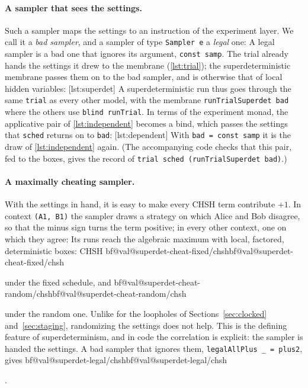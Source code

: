 \documentclass[11pt]{article}
\makeatletter
\newcommand{\hs}{\lstinline[style=hask,basicstyle=\ttfamily,frame=none]}
\newcommand{\val}[1]{\ifcsname bf@val@#1\endcsname\csname bf@val@#1\endcsname
  \else\PackageError{paper}{No value #1 in generated/values.tex}{}\fi}
\makeatother
\begin{document}
\paragraph{A sampler that sees the settings.} Such a sampler maps the settings to an instruction of the experiment layer. We call it a \emph{bad sampler}, and a sampler of type \hs|Sampler e| a \emph{legal} one:
A legal sampler is a bad one that ignores its argument, \hs|const samp|. The trial already hands the settings it drew to the membrane (\ref{lst:trial}); the superdeterministic membrane passes them on to the bad sampler, and is otherwise that of local hidden variables:
[lst:superdet]
A superdeterministic run thus goes through the same \hs|trial| as every other model, with the membrane \hs|runTrialSuperdet bad| where the others use \hs|blind runTrial|. In terms of the experiment monad, the applicative pair of \ref{lst:independent} becomes a bind, which passes the settings that \hs|sched| returns on to \hs|bad|:
[lst:dependent]
With \hs|bad = const samp| it is the draw of \ref{lst:independent} again. (The accompanying code checks that this pair, fed to the boxes, gives the record of \hs|trial sched (runTrialSuperdet bad)|.)

\paragraph{A maximally cheating sampler.} With the settings in hand, it is easy to make every CHSH term contribute $+1$. In context \hs|(A1, B1)| the sampler draws a strategy on which Alice and Bob disagree, so that the minus sign turns the term positive; in every other context, one on which they agree:
Its runs reach the algebraic maximum with local, factored, deterministic boxes: CHSH \val{superdet-cheat-fixed/chsh} under the fixed schedule, and \val{superdet-cheat-random/chsh} under the random one. Unlike for the loopholes of Sections~\ref{sec:clocked} and~\ref{sec:staging}, randomizing the settings does not help. This is the defining feature of superdeterminism, and in code the correlation is explicit: the sampler is handed the settings. A bad sampler that ignores them, \hs|legalAllPlus _ = plus2|, gives \val{superdet-legal/chsh}.
\end{document}

